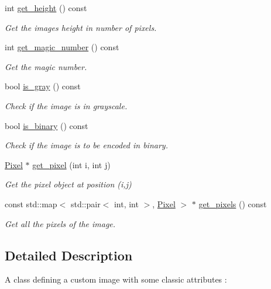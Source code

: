 \begin{DoxyCompactItemize}
int \hyperlink{classImage_a04c7d24c9473e327e15c560c8193b684}{get\+\_\+height} () const
\begin{DoxyCompactList}\small\item\em Get the image\textquotesingle{}s height in number of pixels. \end{DoxyCompactList}\item 
int \hyperlink{classImage_aa5d430b86cb564263b5fc09f0574daff}{get\+\_\+magic\+\_\+number} () const
\begin{DoxyCompactList}\small\item\em Get the magic number. \end{DoxyCompactList}\item 
bool \hyperlink{classImage_a312d5af7ef1f889ad1742b24638d86de}{is\+\_\+gray} () const
\begin{DoxyCompactList}\small\item\em Check if the image is in grayscale. \end{DoxyCompactList}\item 
bool \hyperlink{classImage_a0d6de27cb2fbdf03bcdd68c92f8dbf6a}{is\+\_\+binary} () const
\begin{DoxyCompactList}\small\item\em Check if the image is to be encoded in binary. \end{DoxyCompactList}\item 
\hyperlink{classPixel}{Pixel} $\ast$ \hyperlink{classImage_a7c7f88f027f4bfc564883fcf5a2e799b}{get\+\_\+pixel} (int i, int j)
\begin{DoxyCompactList}\small\item\em Get the pixel object at position (i,j) \end{DoxyCompactList}\item 
const std\+::map$<$ std\+::pair$<$ int, int $>$, \hyperlink{classPixel}{Pixel} $>$ $\ast$ \hyperlink{classImage_af1a715bc9351b3385bd0591dfe3ce464}{get\+\_\+pixels} () const
\begin{DoxyCompactList}\small\item\em Get all the pixels of the image. \end{DoxyCompactList}\end{DoxyCompactItemize}


\subsection{Detailed Description}
A class defining a custom image with some classic attributes \+: 


